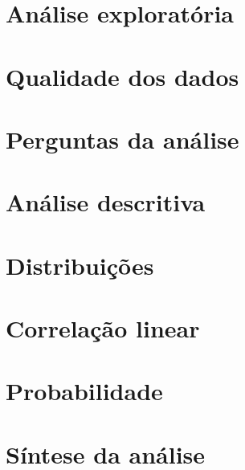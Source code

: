 

\section{Análise exploratória}



\section{Qualidade dos dados}



\section{Perguntas da análise}



\section{Análise descritiva}



\section{Distribuições}



\section{Correlação linear}



\section{Probabilidade}



\section{Síntese da análise}




